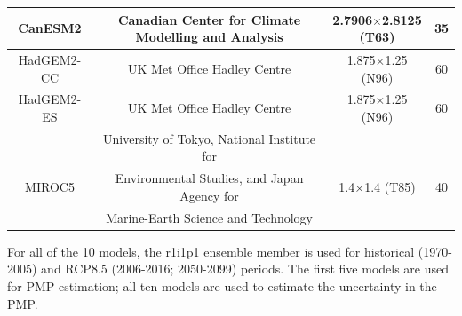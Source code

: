 \begin{table}
\begin{threeparttable}
\begin{tabular}{cccc}
			\hline
			CanESM2	    & Canadian Center for Climate Modelling and Analysis	         & 2.7906$\times$2.8125 (T63)& 35  \\
			\hline
			HadGEM2-CC  & UK Met Office Hadley Centre                                    & 1.875$\times$1.25 (N96)   & 60  \\
			\hline
			HadGEM2-ES  & UK Met Office Hadley Centre                                    & 1.875$\times$1.25 (N96)   & 60  \\
			\hline
			            & University of Tokyo, National Institute for                    &                           &     \\
			MIROC5      & Environmental Studies, and Japan Agency for                    & 1.4$\times$1.4 (T85)      & 40  \\
			            & Marine-Earth Science and Technology                            &                           &     \\
			\hline
		\end{tabular}
		\begin{tablenotes}
			\small
			\item For all of the 10 models, the r1i1p1 ensemble member is used for historical (1970-2005) and RCP8.5 (2006-2016; 2050-2099) periods. The first five models are used for PMP estimation; all ten models are used to estimate the uncertainty in the PMP.
		\end{tablenotes}
	\end{threeparttable}
	\label{table:5-1}
\end{table}

